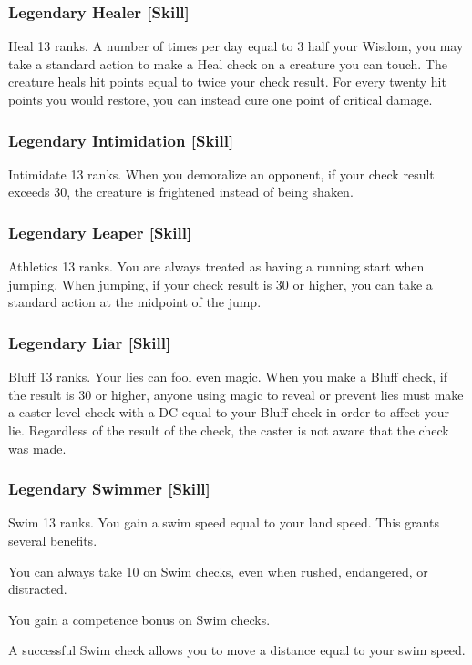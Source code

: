 \subsubsection{Legendary Healer [Skill]}
\featpre Heal 13 ranks.
\featben A number of times per day equal to 3 \add half your Wisdom, you may take a standard action to make a Heal check on a creature you can touch. The creature heals hit points equal to twice your check result. For every twenty hit points you would restore, you can instead cure one point of critical damage.

\subsubsection{Legendary Intimidation [Skill]}
\featpre Intimidate 13 ranks.
\featben When you demoralize an opponent, if your check result exceeds 30, the creature is frightened instead of being shaken.

\subsubsection{Legendary Leaper [Skill]}
\featpre Athletics 13 ranks.
\featben You are always treated as having a running start when jumping. When jumping, if your check result is 30 or higher, you can take a standard action at the midpoint of the jump.

\subsubsection{Legendary Liar [Skill]}
\featpre Bluff 13 ranks.
\featben Your lies can fool even magic. When you make a Bluff check, if the result is 30 or higher, anyone using magic to reveal or prevent lies must make a caster level check with a DC equal to your Bluff check in order to affect your lie. Regardless of the result of the check, the caster is not aware that the check was made.

\subsubsection{Legendary Swimmer [Skill]}
\featpre Swim 13 ranks.
\featben You gain a swim speed equal to your land speed. This grants several benefits.
\begin{itemize*}
  \item You can always take 10 on Swim checks, even when rushed, endangered, or distracted. 
  \item You gain a  competence bonus on Swim checks.
  \item A successful Swim check allows you to move a distance equal to your swim speed.
\end{itemize*}

